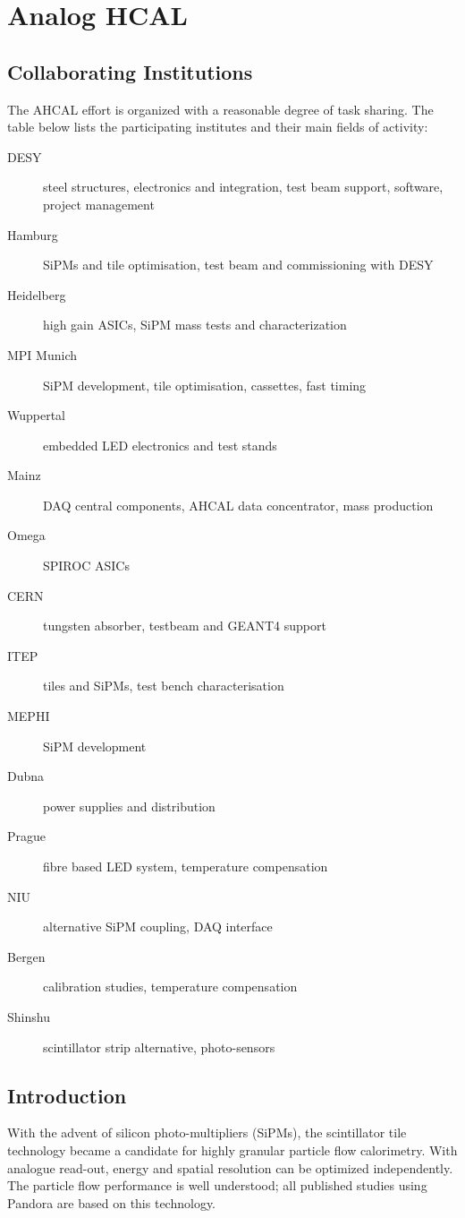 \section{Analog HCAL}
\subsection{Collaborating Institutions}
The AHCAL effort is organized with a reasonable degree of task sharing. The table below lists the participating institutes and their main fields of activity:
\begin{description}
\item[DESY] steel structures, electronics and integration, test beam support, software, project management
\item[Hamburg] SiPMs and tile optimisation, test beam and commissioning with DESY
\item[Heidelberg] high gain ASICs, SiPM mass tests and characterization
\item[MPI Munich] SiPM development, tile optimisation, cassettes, fast timing
\item[Wuppertal] embedded LED electronics and test stands
\item[Mainz] DAQ central components, AHCAL data concentrator, mass production
\item[Omega] SPIROC ASICs
\item[CERN] tungsten absorber, testbeam and GEANT4 support
\item[ITEP] tiles and SiPMs, test bench characterisation
\item[MEPHI] SiPM development
\item[Dubna] power supplies and distribution
\item[Prague] fibre based LED system, temperature compensation
\item[NIU] alternative SiPM coupling, DAQ interface
\item[Bergen] calibration studies, temperature compensation
\item[Shinshu] scintillator strip alternative, photo-sensors
\end{description}
\subsection{Introduction}
With the advent of silicon photo-multipliers (SiPMs), the scintillator tile technology became a candidate for highly granular particle flow calorimetry. With analogue read-out, energy and spatial resolution can be optimized independently. The particle flow performance is well understood; all published studies using Pandora are based on this technology.


